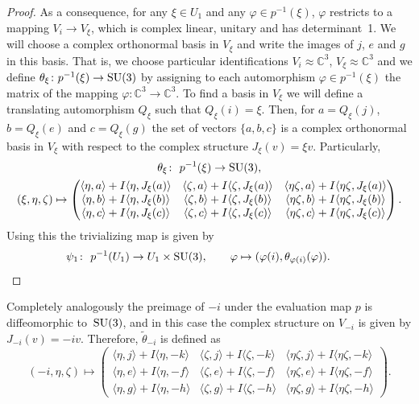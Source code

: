 \documentclass[pdftex]{sigma}
\numberwithin{equation}{section}
\newcommand{\SC}{\mathbb{C}} %
\begin{document}
\begin{proof}
As a consequence, for any $\xi \in U_1 $ and any $\varphi \in p^{-1}(\xi)$, $\varphi$ restricts to a mapping $V_i \rightarrow V_\xi$, which is complex linear, unitary and has determinant~1. We will choose a complex orthonormal basis in $V_\xi$ and write the images of $j$, $e$ and $g$ in this basis. That is, we choose particular identifications $V_i \approx \SC^3$, $V_\xi \approx \SC^3$ and we define $\theta_\xi \colon p^{-1}(\xi) \rightarrow {\rm SU}(3)$ by assigning to each automorphism $\varphi \in p^{-1}(\xi)$ the matrix of the mapping $\varphi\colon \SC^3 \rightarrow \SC^3$. To find a basis in $V_\xi$ we will define a translating automorphism $Q_\xi$ such that $Q_\xi(i)=\xi$. Then, for $a=Q_\xi(j)$, $b=Q_\xi(e)$ and $c=Q_\xi(g)$ the set of vectors $\{a,b,c\}$ is a complex orthonormal basis in $V_\xi$ with respect to the complex structure $J_\xi(v)=\xi v$. Particularly,
 \begin{gather}
\theta_\xi \colon \ p^{-1}(\xi) \rightarrow {\rm SU}(3),\nonumber\\
 (\xi,\eta,\zeta) \mapsto
 \begin{pmatrix}
 \langle \eta,a \rangle + I\langle \eta,J_\xi(a) \rangle & \langle \zeta,a \rangle + I\langle \zeta,J_\xi(a) \rangle & \langle \eta \zeta,a \rangle + I\langle \eta \zeta,J_\xi(a) \rangle\\
 \langle \eta,b \rangle +I\langle \eta,J_\xi(b) \rangle & \langle \zeta,b \rangle +I\langle \zeta,J_\xi(b) \rangle & \langle \eta \zeta,b \rangle +I\langle \eta \zeta,J_\xi(b) \rangle\\
 \langle \eta,c \rangle +I\langle \eta,J_\xi(c) \rangle & \langle \zeta,c \rangle +I\langle \zeta,J_\xi(c) \rangle & \langle \eta \zeta,c \rangle +I\langle \eta \zeta,J_\xi(c) \rangle
 \end{pmatrix}.\label{eq:thetaxi}
\end{gather}
 Using this the trivializing map is given by
 \begin{gather*} \psi_1\colon \ p^{-1}(U_1) \rightarrow U_1 \times {\rm SU}(3), \qquad \varphi \mapsto (\varphi(i),\theta_{\varphi(i)}(\varphi) ) .\tag*{\qed}\end{gather*}
\renewcommand{\qed}{}
\end{proof}

Completely analogously the preimage of $-i$ under the evaluation map $p$ is diffeomorphic to~${\rm SU}(3)$, and in this case the complex structure on $V_{-i}$ is given by $J_{-i}(v)=-iv$. Therefore, $\tilde{\theta}_{-i}$ is defined as
\[ (-i,\eta,\zeta) \mapsto
\begin{pmatrix}
\langle \eta,j \rangle + I\langle \eta,-k \rangle & \langle \zeta,j \rangle + I\langle \zeta,-k \rangle & \langle \eta \zeta,j \rangle + I\langle \eta \zeta,-k \rangle\\
\langle \eta,e \rangle +I\langle \eta,-f \rangle & \langle \zeta,e \rangle +I\langle \zeta,-f \rangle & \langle \eta \zeta,e \rangle +I\langle \eta \zeta,-f \rangle\\
\langle \eta,g \rangle +I\langle \eta,-h \rangle & \langle \zeta,g \rangle +I\langle \zeta,-h \rangle & \langle \eta \zeta,g \rangle +I\langle \eta \zeta,-h \rangle
\end{pmatrix}.
\]
\end{document}
